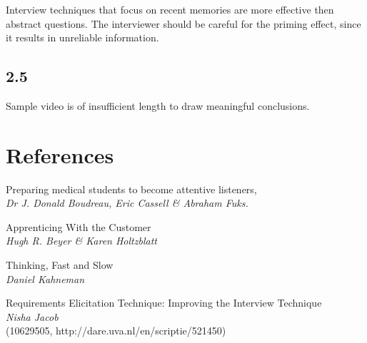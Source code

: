 Interview techniques that focus on recent memories are more effective then abstract questions. The interviewer should be careful for the priming effect, since it results in unreliable information.

\section*{2.5}

Sample video is of insufficient length to draw meaningful conclusions.

\chapter{References}

\begin{thebibliography}{9}	
	Preparing medical students to become attentive listeners, \\
	\emph{Dr J. Donald Boudreau, Eric Cassell \& Abraham Fuks.}
	
	Apprenticing With the Customer \\
	\emph{Hugh R. Beyer \& Karen Holtzblatt}
	
	Thinking, Fast and Slow \\
	\emph{Daniel Kahneman}
	
	Requirements Elicitation Technique: Improving the Interview Technique \\
	\emph{ Nisha Jacob}\\
    (10629505, http://dare.uva.nl/en/scriptie/521450) 
\end{thebibliography}

\begin{thebibliography}{9}
	
\end{thebibliography}


\appendix



